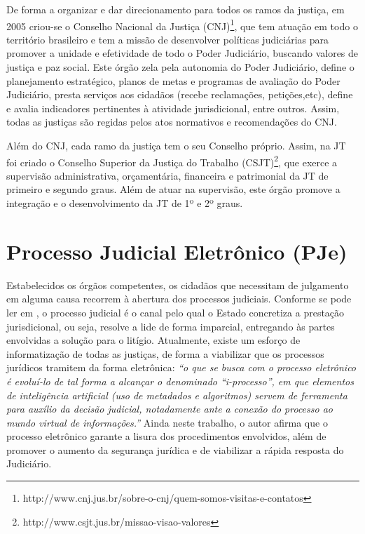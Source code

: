 De forma a organizar e dar direcionamento para todos os ramos da justiça, em 2005 criou-se o Conselho Nacional da Justiça (CNJ)\footnote{http://www.cnj.jus.br/sobre-o-cnj/quem-somos-visitas-e-contatos}, que tem atuação em todo o território brasileiro e tem a missão de desenvolver políticas judiciárias para promover a unidade e efetividade de todo o Poder Judiciário, buscando valores de justiça e paz social. Este órgão zela pela autonomia do Poder Judiciário, define o planejamento estratégico, planos de metas e programas de avaliação do Poder Judiciário, presta serviços aos cidadãos (recebe reclamações, petições,etc), define e avalia indicadores pertinentes à atividade jurisdicional, entre outros.   Assim, todas as justiças são regidas pelos atos normativos e recomendações do CNJ.      

Além do CNJ, cada ramo da justiça tem o seu Conselho próprio. Assim, na JT foi criado o Conselho Superior da Justiça do Trabalho (CSJT)\footnote{http://www.csjt.jus.br/missao-visao-valores}, que exerce a supervisão administrativa, orçamentária, financeira e patrimonial da JT de primeiro e segundo graus. Além de atuar na supervisão, este órgão promove a integração e o desenvolvimento da JT de 1º e 2º graus. 


\section{\label{sec:pje}Processo Judicial Eletrônico (PJe)}%

Estabelecidos os órgãos competentes, os cidadãos que necessitam de julgamento em alguma causa recorrem à abertura dos processos judiciais. Conforme se pode ler em \cite{carvalho_o_2017}, o processo judicial é o canal pelo qual o Estado concretiza a prestação jurisdicional, ou seja, resolve a lide de forma imparcial, entregando às partes envolvidas a solução para o litígio. Atualmente, existe um esforço de informatização de todas as justiças, de forma a viabilizar que os processos jurídicos tramitem da forma eletrônica: \textit{``o que se busca com o processo eletrônico é evoluí-lo de tal forma a alcançar o denominado “i-processo”, em que elementos de inteligência artificial (uso de metadados e algoritmos) servem de ferramenta para auxílio da decisão judicial, notadamente ante a conexão do processo ao mundo virtual de informações.''} Ainda neste trabalho, o autor afirma que o processo eletrônico garante a lisura dos procedimentos envolvidos, além de promover o aumento da segurança jurídica e de viabilizar a rápida resposta do Judiciário.  

